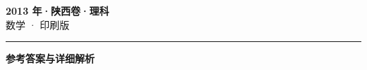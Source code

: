 \documentclass[zihao=5, a4paper]{ctexart}
\begin{document}
\begin{center}
  {\Large\bfseries 2013 年·陕西卷·理科}\\[4pt]
  {\large 数学 · 印刷版}
\end{center}
\medskip
{}

\par\bigskip\hrule\bigskip
{}
\Needspace{0.55\textheight}
\begin{center}{\large\bfseries 参考答案与详细解析}\end{center}
\smallskip

\end{document}
